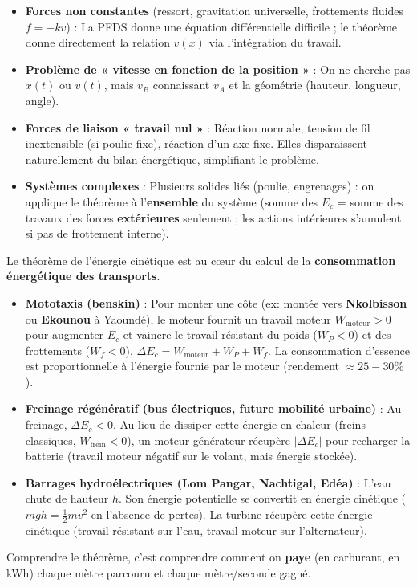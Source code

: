 \documentclass[11pt]{article}
\begin{document}
\begin{itemize}
    \item \textbf{Forces non constantes} (ressort, gravitation universelle, frottements fluides $f = -kv$) : La PFDS donne une équation différentielle difficile ; le théorème donne directement la relation $v(x)$ via l'intégration du travail.
    \item \textbf{Problème de « vitesse en fonction de la position »} : On ne cherche pas $x(t)$ ou $v(t)$, mais $v_B$ connaissant $v_A$ et la géométrie (hauteur, longueur, angle).
    \item \textbf{Forces de liaison « travail nul »} : Réaction normale, tension de fil inextensible (si poulie fixe), réaction d'un axe fixe. Elles disparaissent naturellement du bilan énergétique, simplifiant le problème.
    \item \textbf{Systèmes complexes} : Plusieurs solides liés (poulie, engrenages) : on applique le théorème à l'\textbf{ensemble} du système (somme des $E_c$ = somme des travaux des forces \textbf{extérieures} seulement ; les actions intérieures s'annulent si pas de frottement interne).
\end{itemize}

\begin{savaistu}
Le théorème de l'énergie cinétique est au cœur du calcul de la \textbf{consommation énergétique des transports}.
\begin{itemize}
    \item \textbf{Mototaxis (benskin)} : Pour monter une côte (ex: montée vers \textbf{Nkolbisson} ou \textbf{Ekounou} à Yaoundé), le moteur fournit un travail moteur $W_{\text{moteur}} > 0$ pour augmenter $E_c$ et vaincre le travail résistant du poids ($W_P < 0$) et des frottements ($W_f < 0$). $\Delta E_c = W_{\text{moteur}} + W_P + W_f$. La consommation d'essence est proportionnelle à l'énergie fournie par le moteur (rendement $\approx 25-30\%$).
    \item \textbf{Freinage régénératif (bus électriques, future mobilité urbaine)} : Au freinage, $\Delta E_c < 0$. Au lieu de dissiper cette énergie en chaleur (freins classiques, $W_{\text{frein}} < 0$), un moteur-générateur récupère $|\Delta E_c|$ pour recharger la batterie (travail moteur négatif sur le volant, mais énergie stockée).
    \item \textbf{Barrages hydroélectriques (Lom Pangar, Nachtigal, Edéa)} : L'eau chute de hauteur $h$. Son énergie potentielle se convertit en énergie cinétique ($mg h = \frac{1}{2}mv^2$ en l'absence de pertes). La turbine récupère cette énergie cinétique (travail résistant sur l'eau, travail moteur sur l'alternateur).
\end{itemize}
Comprendre le théorème, c'est comprendre comment on \textbf{paye} (en carburant, en kWh) chaque mètre parcouru et chaque mètre/seconde gagné.
\end{savaistu}
\end{document}
